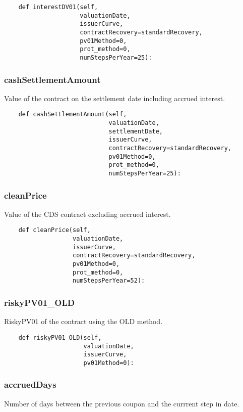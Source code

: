 \documentclass[twoside,11pt]{book}
\begin{document}
\begin{lstlisting}
    def interestDV01(self,
                     valuationDate,
                     issuerCurve,
                     contractRecovery=standardRecovery,
                     pv01Method=0,
                     prot_method=0,
                     numStepsPerYear=25):
\end{lstlisting}

\subsubsection*{{\bf cashSettlementAmount}}
Value of the contract on the settlement date including accrued interest.  

\begin{lstlisting}
    def cashSettlementAmount(self,
                             valuationDate,
                             settlementDate,
                             issuerCurve,
                             contractRecovery=standardRecovery,
                             pv01Method=0,
                             prot_method=0,
                             numStepsPerYear=25):
\end{lstlisting}

\subsubsection*{{\bf cleanPrice}}
Value of the CDS contract excluding accrued interest.  

\begin{lstlisting}
    def cleanPrice(self,
                   valuationDate,
                   issuerCurve,
                   contractRecovery=standardRecovery,
                   pv01Method=0,
                   prot_method=0,
                   numStepsPerYear=52):
\end{lstlisting}

\subsubsection*{{\bf riskyPV01\_OLD}}
RiskyPV01 of the contract using the OLD method.  

\begin{lstlisting}
    def riskyPV01_OLD(self,
                      valuationDate,
                      issuerCurve,
                      pv01Method=0):
\end{lstlisting}

\subsubsection*{{\bf accruedDays}}
Number of days between the previous coupon and the currrent step in date.  
\end{document}

